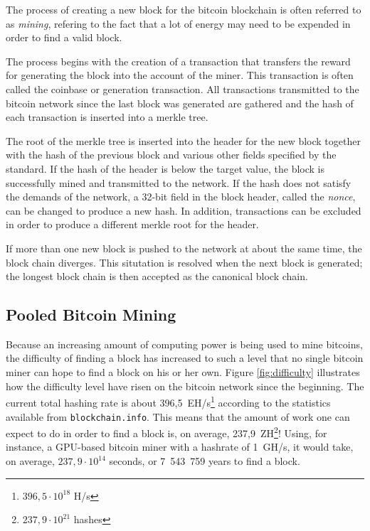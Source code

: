 The process of creating a new block for the bitcoin blockchain is often referred to as \textit{mining},
refering to the fact that a lot of energy may need to be expended in order to find a valid block.

The process begins with the creation of a transaction that transfers the reward for generating the block
into the account of the miner. This transaction is often called the coinbase or generation transaction.
All transactions transmitted to the bitcoin network since the last block was generated are gathered and
the hash of each transaction is inserted into a merkle tree.

The root of the merkle tree is inserted into the header for the new block together with the hash of the
previous block and various other fields specified by the standard. If the hash of the header is below the
target value, the block is successfully mined and transmitted to the network. If the hash does not satisfy
the demands of the network, a 32-bit field in the block header, called the \textit{nonce}, can be changed
to produce a new hash. In addition, transactions can be excluded in order to produce a different merkle
root for the header.

If more than one new block is pushed to the network at about the same time, the block chain diverges.
This situtation is resolved when the next block is generated; the longest block chain is then accepted
as the canonical block chain. \cite{bitcoin}

\subsection{Pooled Bitcoin Mining}

Because an increasing amount of computing power is being used to mine bitcoins, the difficulty of finding
a block has increased to such a level that no single bitcoin miner can hope to find a block on his or her
own. Figure \ref{fig:difficulty} illustrates how the difficulty level have risen on the bitcoin network
since the beginning. The current total hashing rate is about 396,5~EH/s\footnote{$396,5\cdot 10^{18}$ H/s} according to the
statistics available from \texttt{blockchain.info}. This means that the amount of work one can expect to
do in order to find a block is, on average, 237,9~ZH\footnote{$237,9\cdot 10^{21}$ hashes}! Using, for instance,
a GPU-based bitcoin miner with a hashrate of 1~GH/s, it would take, on average, $237,9\cdot 10^{14}$ seconds,
or 7~543~759 years to find a block.

